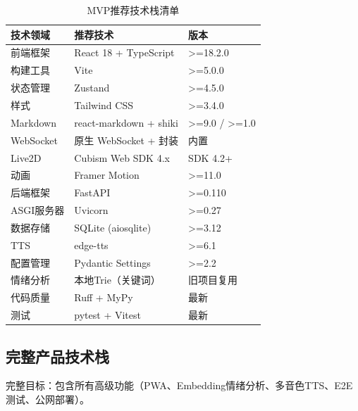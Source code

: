 \documentclass[fontset=mac,a4paper,11pt]{ctexart}
\begin{document}
\begin{table}[H]
\centering
\caption{MVP推荐技术栈清单}
\label{tab:mvp-stack}
\begin{tabular}{L{3.5cm}L{4.5cm}L{4cm}}
\toprule
\textbf{技术领域} & \textbf{推荐技术} & \textbf{版本} \\
\midrule
{}
前端框架 & React 18 + TypeScript & >=18.2.0 \\
构建工具 & Vite & >=5.0.0 \\
状态管理 & Zustand & >=4.5.0 \\
样式 & Tailwind CSS & >=3.4.0 \\
Markdown & react-markdown + shiki & >=9.0 / >=1.0 \\
WebSocket & 原生 WebSocket + 封装 & 内置 \\
Live2D & Cubism Web SDK 4.x & SDK 4.2+ \\
动画 & Framer Motion & >=11.0 \\
后端框架 & FastAPI & >=0.110 \\
ASGI服务器 & Uvicorn & >=0.27 \\
数据存储 & SQLite (aiosqlite) & >=3.12 \\
TTS & edge-tts & >=6.1 \\
配置管理 & Pydantic Settings & >=2.2 \\
情绪分析 & 本地Trie（关键词） & 旧项目复用 \\
代码质量 & Ruff + MyPy & 最新 \\
测试 & pytest + Vitest & 最新 \\
\bottomrule
\end{tabular}
\end{table}

\subsection{完整产品技术栈}

完整目标：包含所有高级功能（PWA、Embedding情绪分析、多音色TTS、E2E测试、公网部署）。
\end{document}
